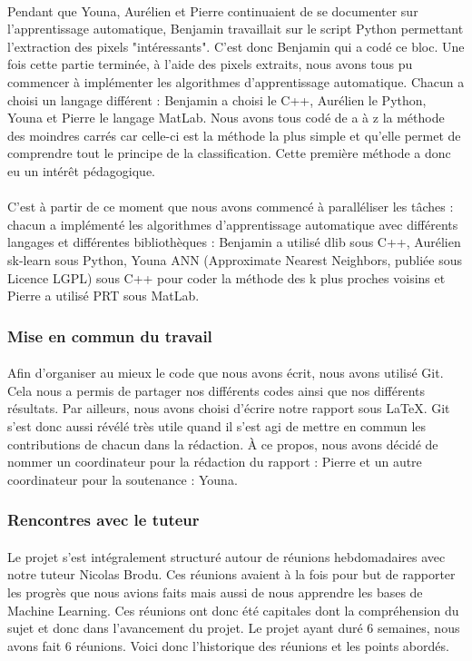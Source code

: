 \documentclass[a4paper,10pt]{article}
\begin{document}
\paragraph{}
Pendant que Youna, Aurélien et Pierre continuaient de se documenter sur l'apprentissage automatique, Benjamin travaillait sur le script Python permettant l'extraction des pixels "intéressants". C'est donc Benjamin qui a codé ce bloc. Une fois cette partie terminée, à l'aide des pixels extraits, nous avons tous pu commencer à implémenter les algorithmes d'apprentissage automatique. Chacun a choisi un langage différent : Benjamin a choisi le C++, Aurélien le Python, Youna et Pierre le langage MatLab. Nous avons tous codé de a à z la méthode des moindres carrés car celle-ci est la méthode la plus simple et qu'elle permet de comprendre tout le principe de la classification. Cette première méthode a donc eu un intérêt pédagogique.
\paragraph{}
C'est à partir de ce moment que nous avons commencé à paralléliser les tâches : chacun a implémenté les algorithmes d'apprentissage automatique avec différents langages et différentes bibliothèques : Benjamin a utilisé dlib sous C++, Aurélien sk-learn sous Python, Youna ANN (Approximate Nearest Neighbors, publiée sous Licence LGPL) sous C++ pour coder la méthode des k plus proches voisins et Pierre a utilisé PRT sous MatLab.
\subsubsection{Mise en commun du travail}
\paragraph{}
Afin d'organiser au mieux le code que nous avons écrit, nous avons utilisé Git. Cela nous a permis de partager nos différents codes ainsi que nos différents résultats. Par ailleurs, nous avons choisi d'écrire notre rapport sous LaTeX. Git s'est donc aussi révélé très utile quand il s'est agi de mettre en commun les contributions de chacun dans la rédaction. À ce propos, nous avons décidé de nommer un coordinateur pour la rédaction du rapport : Pierre et un autre coordinateur pour la soutenance : Youna.
\subsubsection{Rencontres avec le tuteur}
\paragraph{}
Le projet s'est intégralement structuré autour de réunions hebdomadaires avec notre tuteur Nicolas Brodu. Ces réunions avaient à la fois pour but de rapporter les progrès que nous avions faits mais aussi de nous apprendre les bases de Machine Learning. Ces réunions ont donc été capitales dont la compréhension du sujet et donc dans l'avancement du projet. Le projet ayant duré 6 semaines, nous avons fait 6 réunions. Voici donc l'historique des réunions et les points abordés.
\end{document}
